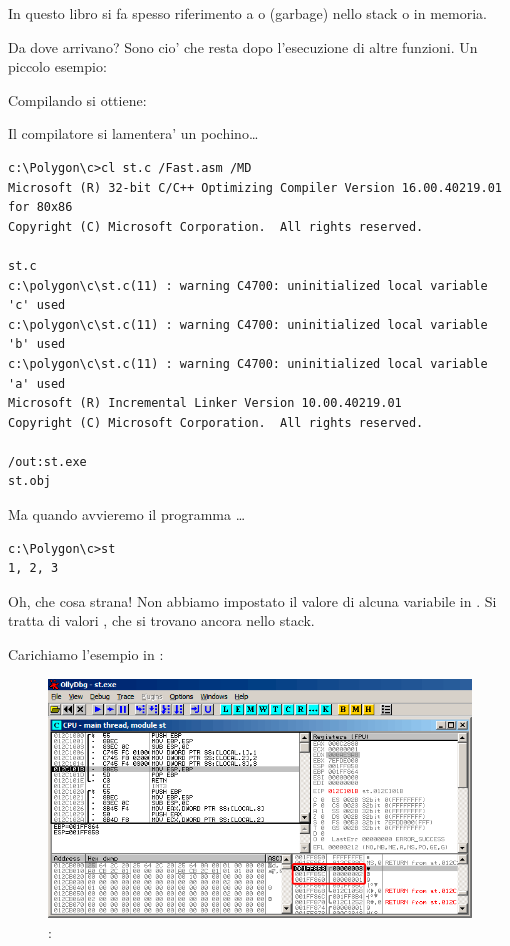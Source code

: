 
In questo libro si fa spesso riferimento a  o  (garbage) nello stack o in memoria.

Da dove arrivano?
Sono cio' che resta dopo l'esecuzione di altre funzioni.
Un piccolo esempio:



Compilando si ottiene:



Il compilatore si lamentera' un pochino\dots

\begin{lstlisting}
c:\Polygon\c>cl st.c /Fast.asm /MD
Microsoft (R) 32-bit C/C++ Optimizing Compiler Version 16.00.40219.01 for 80x86
Copyright (C) Microsoft Corporation.  All rights reserved.

st.c
c:\polygon\c\st.c(11) : warning C4700: uninitialized local variable 'c' used
c:\polygon\c\st.c(11) : warning C4700: uninitialized local variable 'b' used
c:\polygon\c\st.c(11) : warning C4700: uninitialized local variable 'a' used
Microsoft (R) Incremental Linker Version 10.00.40219.01
Copyright (C) Microsoft Corporation.  All rights reserved.

/out:st.exe
st.obj
\end{lstlisting}

Ma quando avvieremo il programma \dots

\begin{lstlisting}
c:\Polygon\c>st
1, 2, 3
\end{lstlisting}

Oh, che cosa strana! Non abbiamo impostato il valore di alcuna variabile in . 
Si tratta di valori  , che si trovano ancora nello stack.

\clearpage
Carichiamo l'esempio in \olly:

\begin{figure}[H]
\centering
\includegraphics[scale=\FigScale]{patterns/02_stack/08_noise/olly1.png}
\caption{\olly: }
\label{fig:stack_noise_olly1}
\end{figure}

